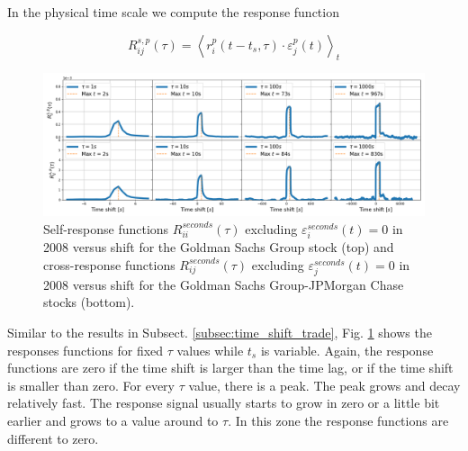 In the physical time scale we compute the response function

\begin{equation}\label{eq:time_shift_physical}
    R_{ij}^{s, p}\left(\tau\right)=\left\langle r^{p}_{i}
    \left(t-t_{s},\tau\right) \cdot\varepsilon^{p}_{j}
    \left(t\right)\right\rangle _{t}
\end{equation}

\begin{figure}[htbp]
    \centering
    \includegraphics[width=\textwidth]{figures/04_shift_physical_RIG_APA.png}
    \caption{Self-response functions $R_{ii}^{seconds}\left(\tau\right)$
             excluding $\varepsilon^{seconds}_{i}\left(t\right) = 0$ in 2008
             versus shift for the Goldman Sachs Group stock (top) and
             cross-response functions $R_{ij}^{seconds}\left(\tau\right)$
             excluding $\varepsilon^{seconds}_{j}\left(t\right) = 0$ in 2008
             versus shift for the Goldman Sachs Group-JPMorgan Chase stocks
             (bottom).}
    \label{fig:shift_physical_scale}
\end{figure}

Similar to the results in Subsect. \ref{subsec:time_shift_trade}, Fig. \ref{fig:shift_physical_scale}
shows the responses functions for fixed $\tau$ values while $t_{s}$ is variable.
Again, the response functions are zero if the time shift is larger than the time lag, or if
the time shift is smaller than zero.
For every $\tau$ value, there is a peak. The peak grows and decay relatively fast.
The response
signal usually starts to grow in zero or a little bit earlier and grows to
a value around to $\tau$. In this zone the response functions are different to zero.

